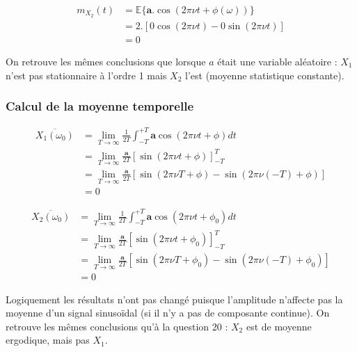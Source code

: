 \documentclass{article}
\begin{document}
\begin{equation}
\begin{aligned}
m_{X_2}(t)
& = \mathbb{E}\{\boldsymbol{a}.\cos(2\pi\nu t+\phi(\omega))\} \\
& = 2.[0\cos(2\pi\nu t) - 0\sin(2\pi\nu t)] \\
& = 0
\end{aligned}
\end{equation}

\noindent
On retrouve les mêmes conclusions que lorsque $a$ était une variable aléatoire : $X_1$ n'est pas stationnaire à l'ordre 1 mais $X_2$ l'est (moyenne statistique constante).

\subsubsection*{Calcul de la moyenne temporelle}

\begin{equation}
\begin{aligned}
\overline{X_1(\omega_0)} & = \lim_{T\rightarrow\infty} \frac{1}{2T}\int_{-T}^{+T}\boldsymbol{a}\cos(2\pi\nu t + \phi) dt \\
& = \lim_{T\rightarrow\infty} \frac{\boldsymbol{a}}{2T}[\sin(2\pi\nu t + \phi)]_{-T}^{T} \\
& = \lim_{T\rightarrow\infty} \frac{\boldsymbol{a}}{2T}[\sin(2\pi\nu T + \phi) - \sin(2\pi\nu (-T) + \phi)] \\
& = 0
\end{aligned}
\end{equation}

\begin{equation}
\begin{aligned}
\overline{X_2(\omega_0)} & = \lim_{T\rightarrow\infty} \frac{1}{2T}\int_{-T}^{+T}\boldsymbol{a}\cos(2\pi\nu t + \phi_0) dt \\
& = \lim_{T\rightarrow\infty} \frac{\boldsymbol{a}}{2T}[\sin(2\pi\nu t + \phi_0)]_{-T}^{T} \\
& = \lim_{T\rightarrow\infty} \frac{\boldsymbol{a}}{2T}[\sin(2\pi\nu T + \phi_0) - \sin(2\pi\nu (-T) + \phi_0)] \\
& = 0
\end{aligned}
\end{equation}

\noindent
Logiquement les résultats n'ont pas changé puisque l'amplitude n'affecte pas la moyenne d'un signal sinusoïdal (si il n'y a pas de composante continue). On retrouve les mêmes conclusions qu'à la question 20 : $X_2$ est de moyenne ergodique, mais pas $X_1$.
\end{document}
